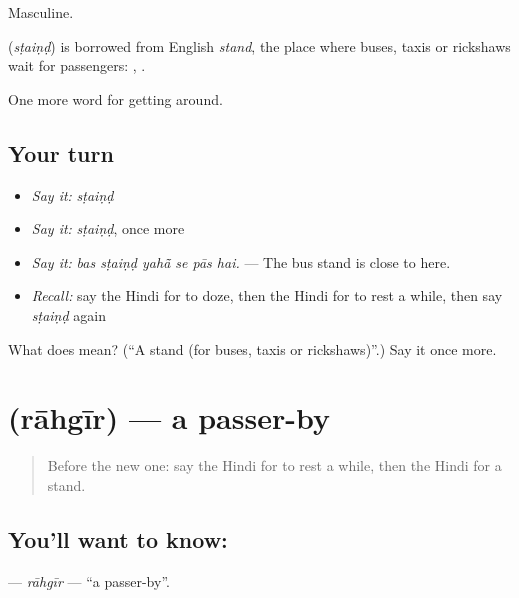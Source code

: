 Masculine.

\begin{cousinweb}
\textbf{} (\emph{sṭaiṇḍ}) is borrowed from English \emph{stand}, the place where buses, taxis or rickshaws wait for passengers:  ,  .
\end{cousinweb}

\begin{grammarlens}[title={What you've built}]
One more word for getting around.
\end{grammarlens}

\subsection*{Your turn}
\begin{itemize}
\raggedright
  \item \emph{Say it:} \emph{sṭaiṇḍ}
  \item \emph{Say it:} \emph{sṭaiṇḍ}, once more
  \item \emph{Say it:} \emph{bas sṭaiṇḍ yahā̃ se pās hai.} — The bus stand is close to here.
  \item \emph{Recall:} say the Hindi for to doze, then the Hindi for to rest a while, then say \emph{sṭaiṇḍ} again
\end{itemize}

\begin{tcolorbox}[breakable,colback=teal!4,colframe=teal!35!black,title={Before you move on}]
What does  mean? (\textquotedblleft{}A stand (for buses, taxis or rickshaws)\textquotedblright{}.) Say it once more.
\end{tcolorbox}
\section[\texorpdfstring{\hi{राहगीर} (rāhgīr)}{राहगीर (rāhgīr)}]{ (rāhgīr) — a passer-by}

\label{lesson:HI-C403-rahgir}



\begin{quote}
Before the new one: say the Hindi for to rest a while, then the Hindi for a stand.
\end{quote}

\subsection*{You'll want to know: }
\textbf{} — \emph{rāhgīr} — \textquotedblleft{}a passer-by\textquotedblright{}.

